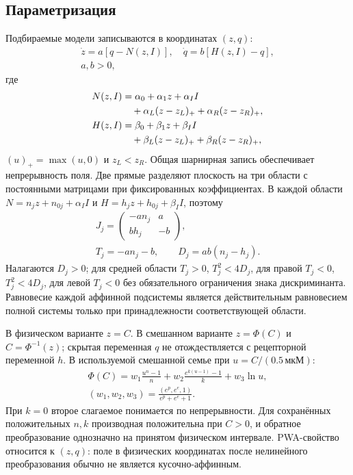 \subsection{Параметризация}
Подбираемые модели записываются в координатах $(z,q)$:
\begin{equation}\label{eq:pwa-ru}
\begin{gathered}
\dot z=a[q-N(z,I)],\quad \dot q=b[H(z,I)-q],\\ a,b>0,
\end{gathered}
\end{equation}
где
\begin{align}
N(z,I)&=\alpha_0+\alpha_1z+\alpha_I I\notag\\
 &\quad+\alpha_L(z-z_L)_++\alpha_R(z-z_R)_+,\\
H(z,I)&=\beta_0+\beta_1z+\beta_I I\notag\\
 &\quad+\beta_L(z-z_L)_++\beta_R(z-z_R)_+,
\end{align}
$(u)_+=\max(u,0)$ и $z_L<z_R$. Общая шарнирная запись обеспечивает непрерывность поля. Две прямые разделяют плоскость на три области с постоянными матрицами при фиксированных коэффициентах. В каждой области $N=n_jz+n_{0j}+\alpha_I I$ и $H=h_jz+h_{0j}+\beta_I I$, поэтому
\begin{equation}
\begin{gathered}
J_j=\begin{pmatrix}-a n_j&a\\ b h_j&-b\end{pmatrix},\\
T_j=-a n_j-b,\qquad D_j=ab(n_j-h_j).
\end{gathered}
\end{equation}
Налагаются $D_j>0$; для средней области $T_j>0$, $T_j^2<4D_j$, для правой $T_j<0$, $T_j^2<4D_j$, для левой $T_j<0$ без обязательного ограничения знака дискриминанта. Равновесие каждой аффинной подсистемы является действительным равновесием полной системы только при принадлежности соответствующей области.

В физическом варианте $z=C$. В смешанном варианте $z=\Phi(C)$ и $C=\Phi^{-1}(z)$; скрытая переменная $q$ не отождествляется с рецепторной переменной $h$. В используемой смешанной семье при $u=C/(0.5\,\text{мкМ})$:
\begin{equation}
\begin{gathered}
\Phi(C)=w_1\frac{u^n-1}{n}+w_2\frac{e^{k(u-1)}-1}{k}+w_3\ln u,\\
(w_1,w_2,w_3)=\frac{(e^p,e^e,1)}{e^p+e^e+1}.
\end{gathered}
\end{equation}
При $k=0$ второе слагаемое понимается по непрерывности. Для сохранённых положительных $n,k$ производная положительна при $C>0$, и обратное преобразование однозначно на принятом физическом интервале. PWA-свойство относится к $(z,q)$: поле в физических координатах после нелинейного преобразования обычно не является кусочно-аффинным.

